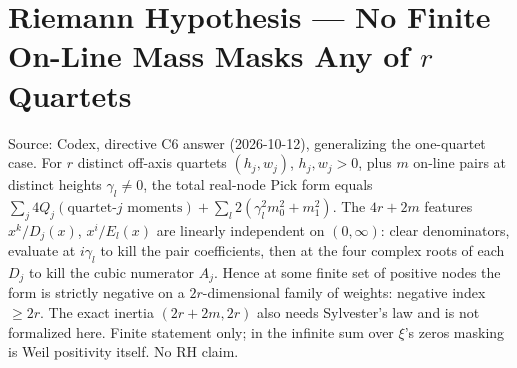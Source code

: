 \documentclass{report}
\theoremstyle{definition}
\begin{document}
\section{Riemann Hypothesis --- No Finite On-Line Mass Masks Any of $r$ Quartets}
Source: Codex, directive C6 answer (2026-10-12), generalizing the one-quartet case. For $r$ distinct off-axis quartets $(h_j,w_j)$, $h_j,w_j>0$, plus $m$ on-line pairs at distinct heights $\gamma_l\ne0$, the total real-node Pick form equals $\sum_j4Q_j(\text{quartet-}j\text{ moments})+\sum_l2(\gamma_l^2m_0^2+m_1^2)$. The $4r+2m$ features $x^k/D_j(x)$, $x^i/E_l(x)$ are linearly independent on $(0,\infty)$: clear denominators, evaluate at $i\gamma_l$ to kill the pair coefficients, then at the four complex roots of each $D_j$ to kill the cubic numerator $A_j$. Hence at some finite set of positive nodes the form is strictly negative on a $2r$-dimensional family of weights: negative index $\ge2r$. The exact inertia $(2r+2m,2r)$ also needs Sylvester's law and is not formalized here. Finite statement only; in the infinite sum over $\xi$'s zeros masking is Weil positivity itself. No RH claim.
\end{document}
